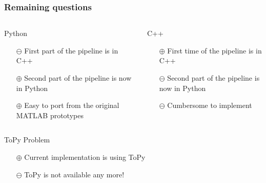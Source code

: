 
\begin{frame}

	\frametitle{Remaining questions}
	\begin{columns}[c] %

	\begin{block}{Python}
	\begin{itemize}
		\item[{\color{red}$\ominus$}] First part of the pipeline is in C++
		\item[{\color{green}$\oplus$}] Second part of the pipeline is now in Python
		\item[{\color{green}$\oplus$}] Easy to port from the original MATLAB prototypes

	\end{itemize}
	\end{block}

	\begin{block}{C++}	
	\begin{itemize}
		\item[{\color{green}$\oplus$}] First time of the pipeline is in C++
		\item[{\color{red}$\ominus$}] Second part of the pipeline is now in Python
		\item[{\color{red}$\ominus$}] Cumbersome to implement
	\end{itemize}
	\vspace{3.5mm}

	\end{block}
	\end{columns}
	\begin{block}{ToPy Problem}
	\begin{itemize}
	\item[{\color{green}$\oplus$}] Current implementation is using ToPy
	\item[{\color{red}$\ominus$}] ToPy is not available any more!
	\end{itemize}
	\end{block}
	
\end{frame}


